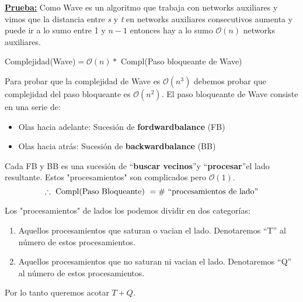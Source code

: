 \documentclass[12pt,a4paper]{report}
\begin{document}
		\textbf{\underline{Prueba:}} Como Wave es un algoritmo que trabaja con networks auxiliares y vimos que la distancia entre \textit{s} y \textit{t} en networks auxiliares consecutivos aumenta y puede ir a lo sumo entre 1 y $n - 1$ entonces hay a lo sumo $\mathcal{O}(n)$ networks auxiliares.
			\begin{center}
				Complejidad(Wave)$ = \mathcal{O}(n) *$ Compl(Paso bloqueante de Wave)
			\end{center}

			\par Para probar que la complejidad de Wave es $\mathcal{O}(n^{3})$ debemos probar que complejidad del paso bloqueante es $\mathcal{O}(n^{2})$. El paso bloqueante de Wave consiste en una serie de:
			\begin{itemize}
				\item Olas hacia adelante: Sucesión de \textbf{fordwardbalance} (FB)
				\item Olas hacia atrás: Sucesión de \textbf{backwardbalance} (BB)
			\end{itemize}

			\par Cada FB y BB es una sucesión de \textquotedblleft \textbf{buscar vecinos}\textquotedblright y \textquotedblleft \textbf{procesar}\textquotedblright el lado resultante. Estos "procesamientos" \; son complicados pero $ \mathcal{O}(1)$.
			\[ \therefore \textup{ Compl(Paso Bloqueante) } = \# \textup{ \textquotedblleft procesamientos de lado\textquotedblright} \]

			\par Los "procesamientos" de lados los podemos dividir en dos categorías:
			\begin{enumerate}
				\item Aquellos procesamientos que saturan o vacian el lado. Denotaremos \textquotedblleft T\textquotedblright \; al número de estos procesamientos.
				\item Aquellos procesamientos que no saturan ni vacian el lado. Denotaremos \textquotedblleft Q\textquotedblright \; al número de estos procesamientos.
			\end{enumerate}
			\par Por lo tanto queremos acotar $T + Q$.
\end{document}
